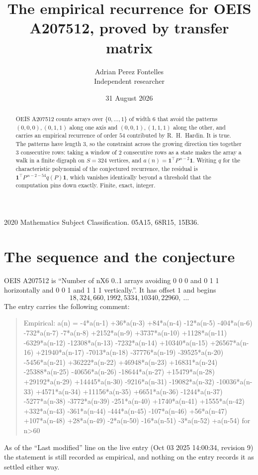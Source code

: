 \documentclass[11pt,a4paper]{article}
\title{The empirical recurrence for OEIS A207512, proved by transfer matrix}
\author{Adrian Perez Fontelles\\ \small Independent researcher}
\date{31 August 2026}
\theoremstyle{plain}
\theoremstyle{definition}
\begin{document}
\maketitle

\begin{abstract}
OEIS A207512 counts arrays over $\{0,\dots,1\}$ of width $6$ that avoid the patterns
$(0,0,0), (0,1,1)$ along one axis and $(0,0,1), (1,1,1)$ along the other, and carries an empirical recurrence of
order $54$ contributed by R.~H.~Hardin. It is true. The patterns have length $3$, so
the constraint across the growing direction ties together $3$ consecutive rows: taking a
window of $2$ consecutive rows as a state makes the array a walk in a finite digraph
on $S=324$ vertices, and $a(n)=\mathbf{1}^{\!\top}P^{\,n-2}\mathbf{1}$. Writing $q$
for the characteristic polynomial of the conjectured recurrence, the residual is
$\mathbf{1}^{\!\top}P^{\,n-2-54}q(P)\mathbf{1}$, which vanishes identically
beyond a threshold that the computation pins down exactly. Finite, exact, integer.
\end{abstract}

\noindent\small 2020 Mathematics Subject Classification. 05A15, 68R15, 15B36.\normalsize

\section{The sequence and the conjecture}

OEIS A207512 is ``Number of nX6 0..1 arrays avoiding 0 0 0 and 0 1 1 horizontally and 0 0 1 and 1 1 1 vertically.''. It has offset
$1$ and begins
\[
18, 324, 660, 1992, 5334, 10340, 22960,\ \dots
\]
The entry carries the following comment:
\begin{quote}\small
Empirical: a(n) = -4*a(n-1) +36*a(n-3) +84*a(n-4) -12*a(n-5) -404*a(n-6) -732*a(n-7) -7*a(n-8) +2152*a(n-9) +3737*a(n-10) +1128*a(n-11) -6329*a(n-12) -12308*a(n-13) -7232*a(n-14) +10340*a(n-15) +26567*a(n-16) +21940*a(n-17) -7013*a(n-18) -37776*a(n-19) -39525*a(n-20) -5456*a(n-21) +36222*a(n-22) +46948*a(n-23) +16831*a(n-24) -25388*a(n-25) -40656*a(n-26) -18644*a(n-27) +15479*a(n-28) +29192*a(n-29) +14445*a(n-30) -9216*a(n-31) -19082*a(n-32) -10036*a(n-33) +4571*a(n-34) +11156*a(n-35) +6651*a(n-36) -1244*a(n-37) -5277*a(n-38) -3772*a(n-39) -251*a(n-40) +1740*a(n-41) +1555*a(n-42) +332*a(n-43) -361*a(n-44) -444*a(n-45) -107*a(n-46) +56*a(n-47) +107*a(n-48) +28*a(n-49) -2*a(n-50) -16*a(n-51) -3*a(n-52) +a(n-54) for n>60
\end{quote}
As of the ``Last modified'' line on the live entry (Oct 03 2025 14:00:34, revision
9) the statement is still recorded as empirical, and nothing on the entry
records it as settled either way.
\end{document}
